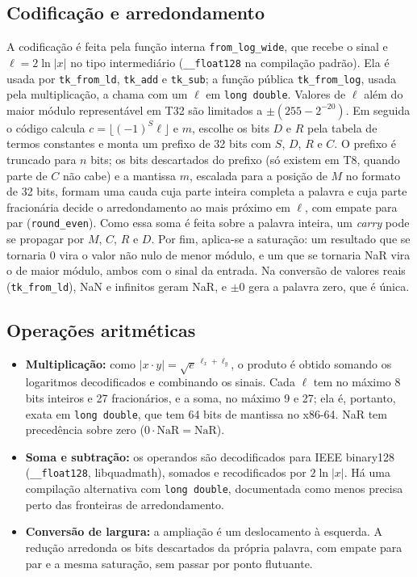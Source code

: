 \documentclass[journal]{IEEEtran}
\begin{document}
\subsection{Codificação e arredondamento}
A codificação é feita pela função interna \texttt{from\_log\_wide}, que
recebe o sinal e $\ell = 2\ln|x|$ no tipo intermediário
(\texttt{\_\_float128} na compilação padrão). Ela é usada por
\texttt{tk\_from\_ld}, \texttt{tk\_add} e \texttt{tk\_sub}; a função
pública \texttt{tk\_from\_log}, usada pela multiplicação, a chama com um
$\ell$ em \texttt{long double}. Valores
de $\ell$ além do maior módulo representável em T32 são limitados a
$\pm(255-2^{-20})$. Em seguida o
código calcula $c=\lfloor (-1)^S\ell \rfloor$ e $m$, escolhe os bits $D$ e
$R$ pela tabela de termos constantes e monta um prefixo de 32 bits com $S$,
$D$, $R$ e $C$. O prefixo é truncado para $n$ bits; os bits descartados do
prefixo (só existem em T8, quando parte de $C$ não cabe) e a mantissa $m$,
escalada para a posição de $M$ no formato de 32 bits, formam uma cauda
cuja parte inteira completa a palavra e cuja parte fracionária decide o
arredondamento ao mais próximo em $\ell$, com empate para par (\texttt{round\_even}). Como essa soma é feita sobre a palavra
inteira, um \emph{carry} pode se propagar por $M$, $C$, $R$ e $D$. Por fim, aplica-se a saturação: um resultado que se
tornaria 0 vira o valor não nulo de menor módulo, e um que se tornaria NaR
vira o de maior módulo, ambos com o sinal da entrada. Na conversão de valores reais (\texttt{tk\_from\_ld}), NaN e
infinitos geram NaR, e $\pm 0$ gera a palavra zero, que é única.

\subsection{Operações aritméticas}
\begin{itemize}
\item \textbf{Multiplicação:} como $|x\cdot y| = \sqrt{e}^{\,\ell_x+\ell_y}$,
o produto é obtido somando os logaritmos decodificados e combinando os
sinais. Cada $\ell$ tem no máximo 8 bits inteiros e 27 fracionários, e a
soma, no máximo 9 e 27; ela é, portanto, exata em \texttt{long double},
que tem 64 bits de mantissa no x86-64. NaR tem precedência sobre
zero ($0\cdot\mathrm{NaR}=\mathrm{NaR}$).
\item \textbf{Soma e subtração:} os operandos são decodificados para
IEEE binary128 (\texttt{\_\_float128}, libquadmath), somados e
recodificados por $2\ln|x|$. Há uma compilação alternativa com
\texttt{long double}, documentada como menos precisa perto das fronteiras
de arredondamento.
\item \textbf{Conversão de largura:} a ampliação é um deslocamento à
esquerda. A redução arredonda os bits descartados da própria palavra, com
empate para par e a mesma saturação, sem passar por ponto flutuante.
\end{itemize}
\end{document}

